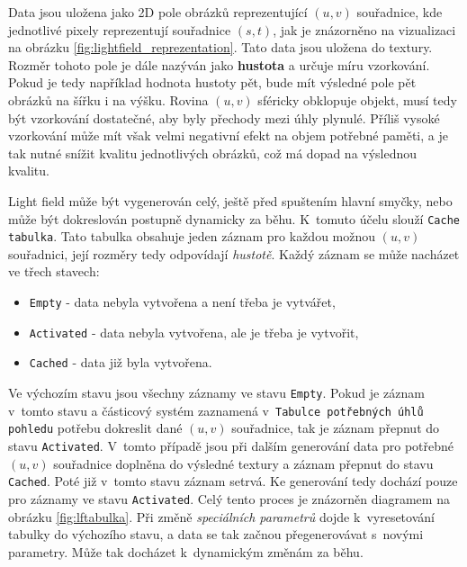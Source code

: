 Data jsou uložena jako 2D pole obrázků reprezentující \((u,v)\) souřadnice, kde jednotlivé pixely reprezentují souřadnice ${(s,t)}$, jak je znázorněno na vizualizaci na obrázku \ref{fig:lightfield_reprezentation}. Tato data jsou uložena do textury. Rozměr tohoto pole je dále nazýván jako \textbf{hustota} a určuje míru vzorkování. Pokud je tedy například hodnota hustoty pět, bude mít výsledné pole pět obrázků na šířku i na výšku. Rovina ${(u,v)}$ sféricky obklopuje objekt, musí tedy být vzorkování dostatečné, aby byly přechody mezi úhly plynulé. Příliš vysoké vzorkování může mít však velmi negativní efekt na objem potřebné paměti, a je tak nutné snížit kvalitu jednotlivých obrázků, což má dopad na výslednou kvalitu. 

Light field může být vygenerován celý, ještě před spuštením hlavní smyčky, nebo může být dokreslován postupně dynamicky za běhu. K~tomuto účelu slouží \texttt{Cache tabulka}. Tato tabulka obsahuje jeden záznam pro každou možnou ${(u,v)}$ souřadnici, její rozměry tedy odpovídají \emph{hustotě}. Každý záznam se může nacházet ve třech stavech: 
\begin{itemize}
    \item \texttt{Empty} - data nebyla vytvořena a není třeba je vytvářet,
    \item \texttt{Activated} - data nebyla vytvořena, ale je třeba je vytvořit,
    \item \texttt{Cached} - data již byla vytvořena.
\end{itemize}
Ve výchozím stavu jsou všechny záznamy ve stavu \texttt{Empty}. Pokud je záznam v~tomto stavu a částicový systém zaznamená v~\texttt{Tabulce potřebných úhlů pohledu} potřebu dokreslit dané ${(u,v)}$ souřadnice, tak je záznam přepnut do stavu \texttt{Activated}. V~tomto případě jsou při dalším generování data pro potřebné ${(u,v)}$ souřadnice doplněna do výsledné textury a záznam přepnut do stavu \texttt{Cached}. Poté již v~tomto stavu záznam setrvá. Ke generování tedy dochází pouze pro záznamy ve stavu \texttt{Activated}. Celý tento proces je znázorněn diagramem na obrázku \ref{fig:lftabulka}. Při změně \emph{speciálních parametrů} dojde k~vyresetování tabulky do výchozího stavu, a data se tak začnou přegenerovávat s~novými parametry. Může tak docházet k~dynamickým změnám za běhu. 

